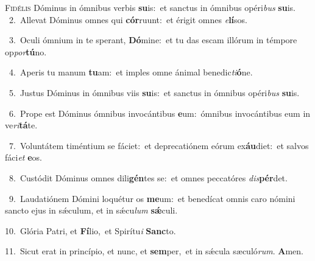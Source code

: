 \lettrine{\initial\textcolor{\initialcolor}{F}}{idélis} Dóminus in ómnibus verbis \textbf{su}\-is:~\star et sanctus in ómnibus opéri\textit{bus} \textbf{su}\-is.\\
{\numbfont\textcolor{\numbcolor}{~2.}}~Allevat Dóminus omnes qui \textbf{cór}\-ruunt:~\star et érigit omnes \textit{e}\-\textbf{lí}sos.\par
{\numbfont\textcolor{\numbcolor}{~3.}}~Oculi ómnium in te sperant, \textbf{Dó}\-mine:~\star et tu das escam illórum in témpore op\-\textit{por}\-\textbf{tú}no.\par
{\numbfont\textcolor{\numbcolor}{~4.}}~Aperis tu manum \textbf{tu}\-am:~\star et imples omne ánimal benedic\-\textit{ti}\-\textbf{ó}ne.\par
{\numbfont\textcolor{\numbcolor}{~5.}}~Justus Dóminus in ómnibus viis \textbf{su}\-is:~\star et sanctus in ómnibus opéri\textit{bus} \textbf{su}\-is.\par
{\numbfont\textcolor{\numbcolor}{~6.}}~Prope est Dóminus ómnibus invocántibus \textbf{e}\-um:~\star ómnibus invocántibus eum in ve\-\textit{ri}\-\textbf{tá}te.\par
{\numbfont\textcolor{\numbcolor}{~7.}}~Voluntátem timéntium se fáciet:~\dagger et deprecatiónem eórum ex\-\textbf{áu}\-diet:~\star et salvos fáci\textit{et} \textbf{e}\-os.\par
{\numbfont\textcolor{\numbcolor}{~8.}}~Custódit Dóminus omnes dili\-\textbf{gén}\-tes se:~\star et omnes peccatóres \textit{dis}\-\textbf{pér}det.\par
{\numbfont\textcolor{\numbcolor}{~9.}}~Laudatiónem Dómini loquétur os \textbf{me}\-um:~\star et benedícat omnis caro nómini sancto ejus in sǽculum, et in sǽcu\textit{lum} \textbf{sǽ}\-culi.\par
{\numbfont\textcolor{\numbcolor}{10.}}~Glória Patri, et \textbf{Fí}\-lio,~\star et Spirítu\textit{i} \textbf{Sanc}\-to.\par
{\numbfont\textcolor{\numbcolor}{11.}}~Sicut erat in princípio, et nunc, et \textbf{sem}\-per,~\star et in sǽcula sæculó\-\textit{rum}\-. \textbf{A}\-men.\par
